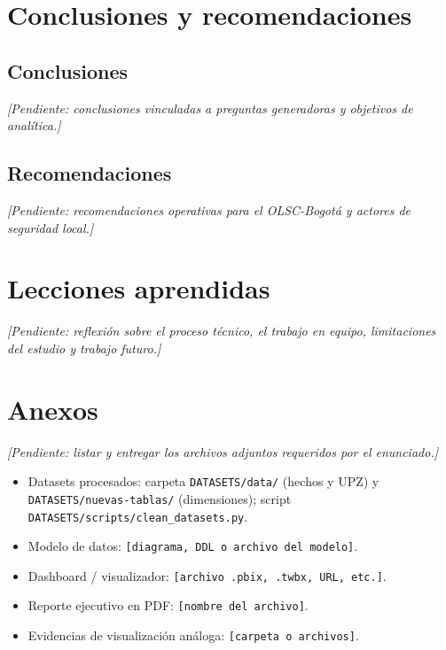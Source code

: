 \documentclass[12pt,letterpaper]{article}
\begin{document}
\section{Conclusiones y recomendaciones}

\subsection{Conclusiones}

\textit{[Pendiente: conclusiones vinculadas a preguntas generadoras y objetivos de analítica.]}

\subsection{Recomendaciones}

\textit{[Pendiente: recomendaciones operativas para el OLSC-Bogotá y actores de seguridad local.]}

\section{Lecciones aprendidas}

\textit{[Pendiente: reflexión sobre el proceso técnico, el trabajo en equipo, limitaciones del estudio y trabajo futuro.]}

\section{Anexos}

\textit{[Pendiente: listar y entregar los archivos adjuntos requeridos por el enunciado.]}
\begin{itemize}
    \item Datasets procesados: carpeta \texttt{DATASETS/data/} (hechos y UPZ) y \texttt{DATASETS/nuevas-tablas/} (dimensiones); script \texttt{DATASETS/scripts/clean\_datasets.py}.
    \item Modelo de datos: \texttt{[diagrama, DDL o archivo del modelo]}.
    \item Dashboard / visualizador: \texttt{[archivo .pbix, .twbx, URL, etc.]}.
    \item Reporte ejecutivo en PDF: \texttt{[nombre del archivo]}.
    \item Evidencias de visualización análoga: \texttt{[carpeta o archivos]}.
\end{itemize}
\end{document}
